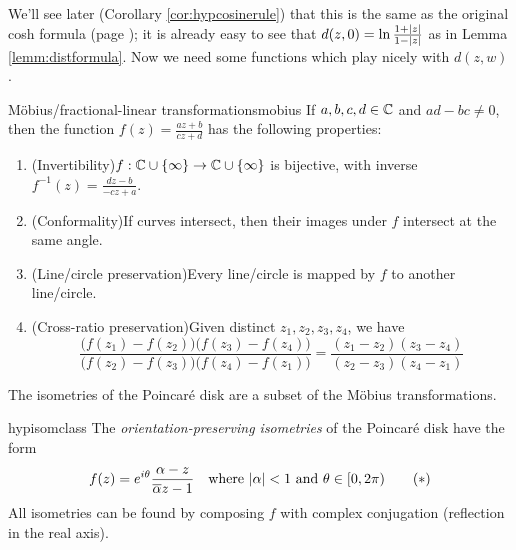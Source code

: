 We'll see later (Corollary \ref{cor:hypcosinerule}) that this is the same as the original cosh formula (page \pageref{lemm:distformula}); it is already easy to see that $d(z,0)=\ln\frac{1+\left| z\right|}{1-\left| z\right|}$ as in Lemma \ref{lemm:distformula}. Now we need some functions which play nicely with $d(z,w)$.


\begin{thm}{Möbius/fractional-linear transformations}{mobius}
If $a,b,c,d\in\mathbb{C}$ and $ad-bc\neq 0$, then the function $f(z)=\tfrac{az+b}{cz+d}$ has the following properties:
\begin{enumerate}
  \item (Invertibility)\lstsp $f:\mathbb{C}\cup\{\infty\}\to \mathbb{C}\cup\{\infty\}$ is bijective, with inverse $f^{-1}(z)=\tfrac{dz-b}{-cz+a}$.
  \item (Conformality)\lstsp If curves intersect, then their images under $f$ intersect at the same angle.
  \item (Line/circle preservation)\lstsp Every line/circle\footnotemark{} is mapped by $f$ to another line/circle.
  \item(Cross-ratio preservation)\lstsp Given distinct $z_1,z_2,z_3,z_4$, we have
	\[\frac{\big(f(z_1)-f(z_2)\big)\big(f(z_3)-f(z_4)\big)}{\big(f(z_2)-f(z_3)\big)\big(f(z_4)-f(z_1)\big)} =\frac{(z_1-z_2)(z_3-z_4)}{(z_2-z_3)(z_4-z_1)}\]
\end{enumerate}
\end{thm}



\goodbreak

The isometries of the Poincaré disk are a subset of the Möbius transformations.

\begin{thm}{}{hypisomclass}
The \emph{orientation-preserving\footnotemark{} isometries} of the Poincaré disk have the form
\[f(z)=e^{i\theta}\frac{\alpha-z}{\overline{\alpha} z-1}\quad\text{where $\left| \alpha\right|<1$ and $\theta\in[0,2\pi)$}\tag{$\ast$}\]
All isometries can be found by composing $f$ with complex conjugation (reflection in the real axis).
\end{thm}



